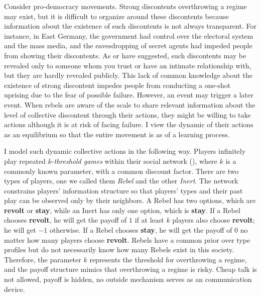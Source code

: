 \documentclass[12pt,letter]{article}
\theoremstyle{definition}
\theoremstyle{definition}
\theoremstyle{remark}
\theoremstyle{claim}
\begin{document}
Consider pro-democracy movements. Strong discontents overthrowing a regime may exist, but it is difficult to organize around these discontents because information about the existence of such discontents is not always transparent. For instance, in East Germany, the government had control over the electoral system and the mass media, and the eavesdropping of secret agents had impeded people from showing their discontents. As \citep{Karl-Dieter1993} or \citep{Chwe2000} have suggested, such discontents may be revealed only to someone whom you trust or have an intimate relationship with, but they are hardly revealed publicly. This lack of common knowledge about the existence of strong discontent impedes people from conducting a one-shot uprising due to the fear of possible failure. However, an event may trigger a later event. When rebels are aware of the scale to share relevant information about the level of collective discontent through their actions, they might be willing to take actions although it is at risk of facing failure. I view the dynamic of their actions as an equilibrium so that the entire movement is as of a learning process. 

I model such dynamic collective actions in the following way. Players infinitely play repeated $k$-\textit{threshold games} within their social network (\citep{Chwe2000}), where $k$ is a commonly known parameter, with a common discount factor. There are two types of players, one we called them \textit{Rebel} and the other \textit{Inert}.  The network constrains players' information structure so that players' types and their past play can be observed only by their neighbors. A Rebel has two options, which are \textbf{revolt} or \textbf{stay}, while an Inert has only one option, which is \textbf{stay}. If a Rebel chooses \textbf{revolt}, he will get the payoff of $1$ if at least $k$ players also choose \textbf{revolt}; he will get $-1$ otherwise. If a Rebel chooses \textbf{stay}, he will get the payoff of $0$ no matter how many players choose \textbf{revolt}. Rebels have a common prior over type profiles but do not necessarily know how many Rebels exist in this society. Therefore, the parameter $k$ represents the threshold for overthrowing a regime, and the payoff structure mimics that overthrowing a regime is risky. Cheap talk is not allowed, payoff is hidden, no outside mechanism serves as an communication device. 
\end{document}
